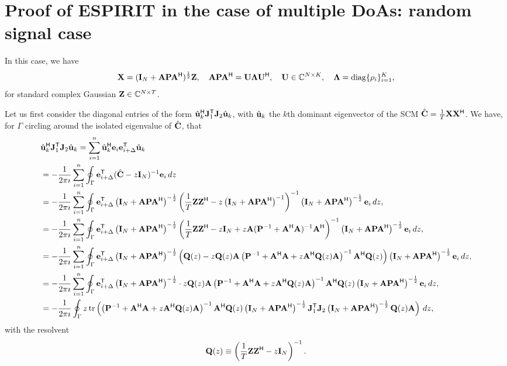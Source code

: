 \documentclass[11pt,a4paper]{article}
\begin{document}
\section{Proof of ESPIRIT in the case of multiple DoAs: random signal case}

In this case, we have 
\begin{equation}
	\X = (\I_N + \A \P \A^\H)^{\frac12} \Z, \quad \A \P \A^\H = \U \bLambda \U^\H, \quad \U \in \CC^{N \times K}, \quad \bLambda = \diag\{ \rho_i \}_{i=1}^K,
\end{equation}
for standard complex Gaussian $\Z \in \CC^{N \times T}$.

Let us first consider the diagonal entries of the form $\hat \uu_k^\H \J_1^\T \J_2 \hat \uu_k$, with $\hat \uu_k$ the $k$th dominant eigenvector of the SCM $\hat \C = \frac1T \X \X^\H$.
We have, for $\Gamma$ circling around the isolated eigenvalue of $\hat \C$, that
\begin{align*}
		&\hat \uu_k^\H \J_1^\T \J_2 \hat \uu_k = \sum_{i=1}^n \hat \uu_k^\H \ee_{i} \ee_{i + \Delta}^\T \hat \uu_k \\ 
		&= -\frac1{2 \pi \imath} \sum_{i=1}^n \oint_{\Gamma} \ee_{i + \Delta}^\T ( \hat \C - z \I_N )^{-1} \ee_{i}\,dz \\ 
		&= -\frac1{2 \pi \imath} \sum_{i=1}^n \oint_{\Gamma} \ee_{i + \Delta}^\T \left(\I_N + \A \P \A^\H \right)^{-\frac12} \left( \frac1T \Z \Z^\H - z  \left(\I_N + \A \P \A^\H \right)^{-1} \right)^{-1} \left(\I_N + \A \P \A^\H \right)^{-\frac12} \ee_{i}\,dz, \\ 
		&= -\frac1{2 \pi \imath} \sum_{i=1}^n \oint_{\Gamma} \ee_{i + \Delta}^\T \left(\I_N + \A \P \A^\H \right)^{-\frac12} \left( \frac1T \Z \Z^\H - z \I_N + z \A(\P^{-1} + \A^\H \A)^{-1} \A^\H \right)^{-1} \left(\I_N + \A \P \A^\H \right)^{-\frac12} \ee_{i}\,dz, \\ 
		&= -\frac1{2 \pi \imath} \sum_{i=1}^n \oint_{\Gamma} \ee_{i + \Delta}^\T \left(\I_N + \A \P \A^\H \right)^{-\frac12} \left( \Q(z) -  z \Q(z) \A \left( \P^{-1} + \A^\H \A + z \A^\H \Q(z) \A \right)^{-1} \A^\H \Q(z) \right) \left(\I_N + \A \P \A^\H \right)^{-\frac12} \ee_{i}\,dz, \\ 
		&= -\frac1{2 \pi \imath} \sum_{i=1}^n \oint_{\Gamma} \ee_{i + \Delta}^\T \left(\I_N + \A \P \A^\H \right)^{-\frac12} \cdot z  \Q(z) \A \left( \P^{-1} + \A^\H \A + z \A^\H \Q(z) \A \right)^{-1} \A^\H \Q(z) \left(\I_N + \A \P \A^\H \right)^{-\frac12} \ee_{i}\,dz,\\
		&=-\frac1{2 \pi \imath} \oint_{\Gamma} z \tr \left(  \left( \P^{-1} + \A^\H \A + z \A^\H \Q(z) \A \right)^{-1} \A^\H \Q(z) \left(\I_N + \A \P \A^\H \right)^{-\frac12} \J_1^\T \J_2 \left(\I_N + \A \P \A^\H \right)^{-\frac12} \Q(z) \A \right)\,dz,
\end{align*}
with the resolvent
\begin{equation}
	\Q(z) \equiv \left( \frac1T \Z \Z^\H - z \I_N \right)^{-1}.
\end{equation}
\end{document}
